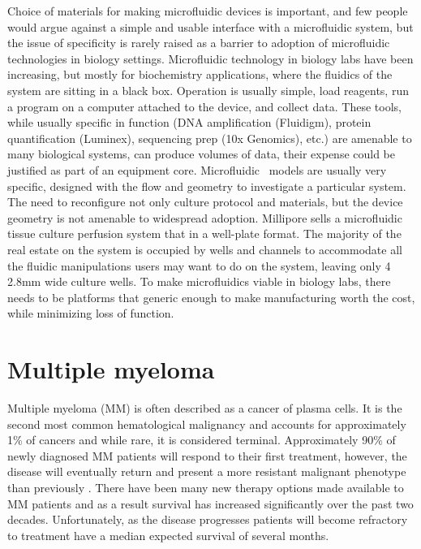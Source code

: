 Choice of materials for making microfluidic devices is important, and few people would argue against a simple and usable interface with a microfluidic system, but the issue of specificity is rarely raised as a barrier to adoption of microfluidic technologies in biology settings. Microfluidic technology in biology labs have been increasing, but mostly for biochemistry applications, where the fluidics of the system are sitting in a black box. Operation is usually simple, load reagents, run a program on a computer attached to the device, and collect data. These tools, while usually specific in function (DNA amplification (Fluidigm), protein quantification (Luminex), sequencing prep (10x Genomics), etc.) are amenable to many biological systems, can produce volumes of data, their expense could be justified as part of an equipment core. Microfluidic \invitro\ models are usually very specific, designed with the flow and geometry to investigate a particular system. The need to reconfigure not only culture protocol and materials, but the device geometry is not amenable to widespread adoption. Millipore sells a microfluidic tissue culture perfusion system that in a well-plate format. The majority of the real estate on the system is occupied by wells and channels to accommodate all the fluidic manipulations users may want to do on the system, leaving only 4 2.8mm wide culture wells. To make microfluidics viable in biology labs, there needs to be platforms that generic enough to make manufacturing worth the cost, while minimizing loss of function.


\section{Multiple myeloma}
Multiple myeloma (MM) is often described as a cancer of plasma cells. It is the second most common hematological malignancy and accounts for approximately 1\% of cancers and while rare, it is considered terminal. Approximately 90\% of newly diagnosed MM patients will respond to their first treatment, however, the disease will eventually return and present a more resistant malignant phenotype than previously \cite{Ludwig2012a, Richardson2007}. There have been many new therapy options made available to MM patients and as a result survival has increased significantly over the past two decades. Unfortunately, as the disease progresses patients will become refractory to treatment have a median expected survival of several months. 

